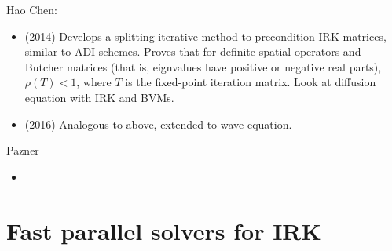 \documentclass[review]{siamart}
\begin{document}
Hao Chen:
\begin{itemize}
	\item (2014) Develops a splitting iterative method to precondition IRK matrices, similar to ADI schemes.
	Proves that for definite spatial operators and Butcher matrices (that is, eignvalues have positive
	or negative real parts), $\rho(T) < 1$, where $T$ is the fixed-point iteration matrix. Look at 
	diffusion equation with IRK and BVMs.
	\item (2016) Analogous to above, extended to wave equation.
\end{itemize}

Pazner
\begin{itemize}
	\item
\end{itemize}



\section{Fast parallel solvers for IRK}
\end{document}
